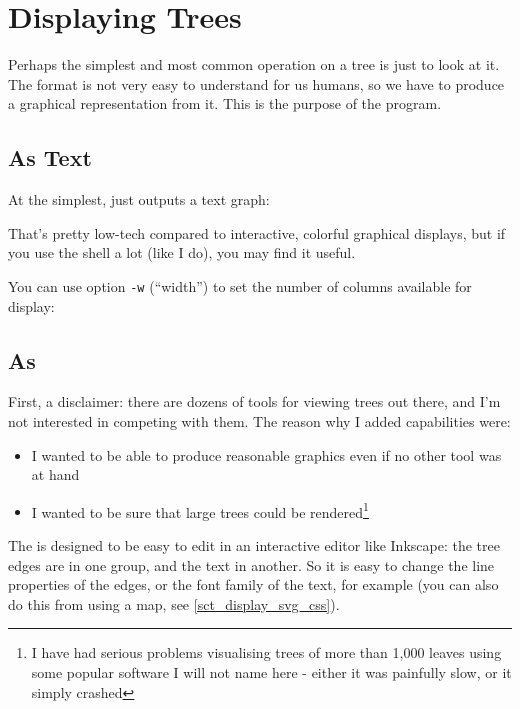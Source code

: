 
\section{Displaying Trees}
\label{sct_display}

Perhaps the simplest and most common operation on a \nw{} tree is just to look at it. The \nw{} format is not very easy to understand for us humans, so we have to produce a graphical representation from it. This is the purpose of the \display{} program. 

\subsection{As Text}
\label{sct_display_text}

At the simplest, \display{} just outputs a text graph:




That's pretty low-tech compared to interactive, colorful graphical displays,
but if you use the shell a lot (like I do), you may find it useful.

You can use option \texttt{-w} (``width'') to set the number of columns available for display:




\subsection{As \svg}
\label{sct_display_svg}

First, a disclaimer: there are dozens of tools for viewing trees out there, and I'm not interested in competing with them. The reason why I added \svg{} capabilities were:
\begin{itemize}
 \item I wanted to be able to produce reasonable graphics even if no other tool was at hand
 \item I wanted to be sure that large trees could be rendered\footnote{I have had serious problems visualising trees of more than 1,000 leaves using some popular software I will not name here - either it was painfully slow, or it simply crashed} 
\end{itemize}
The \svg{} is designed to be easy to edit in an interactive editor like
Inkscape: the tree edges are in one group, and the text in another. So it is easy to change the line properties of the edges, or the font family of the text, for example (you can also do this from \display{} using a \css{} map, see \ref{sct_display_svg_css}).

